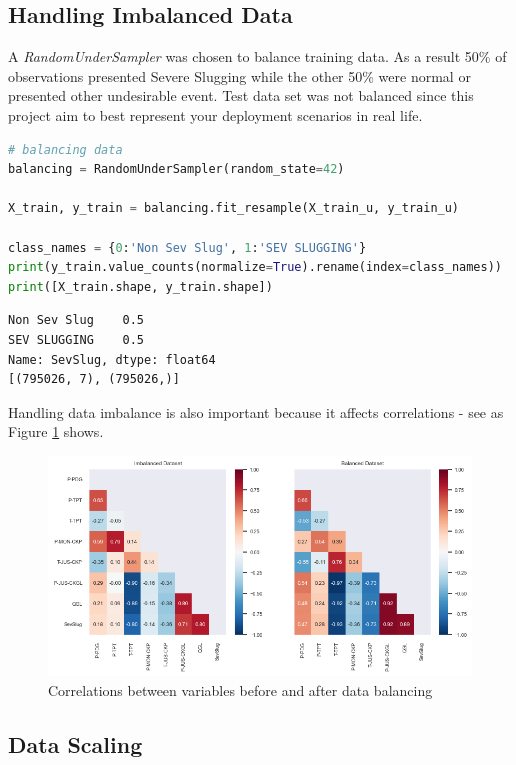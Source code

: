 \documentclass{article}
\begin{document}
\subsection{Handling Imbalanced Data}

A \emph{RandomUnderSampler} was chosen to balance training data. As a result 50\% of observations presented Severe Slugging while the other 50\% were normal or presented other undesirable event. Test data set was not balanced since this project aim to best represent your deployment scenarios in real life.

\begin{lstlisting}[language=Python]
# balancing data 
balancing = RandomUnderSampler(random_state=42)

X_train, y_train = balancing.fit_resample(X_train_u, y_train_u)

class_names = {0:'Non Sev Slug', 1:'SEV SLUGGING'}
print(y_train.value_counts(normalize=True).rename(index=class_names))
print([X_train.shape, y_train.shape])
\end{lstlisting}
\begin{verbatim}
Non Sev Slug    0.5
SEV SLUGGING    0.5
Name: SevSlug, dtype: float64
[(795026, 7), (795026,)]
\end{verbatim}

Handling data imbalance is also important because it affects correlations - see as Figure \ref{fig:correlations} shows.

\begin{figure}
\centering
\includegraphics[width=1\textwidth]{correlations.png}
\caption{\label{fig:correlations}Correlations between variables before and after data balancing}
\end{figure}

\subsection{Data Scaling}
\end{document}

